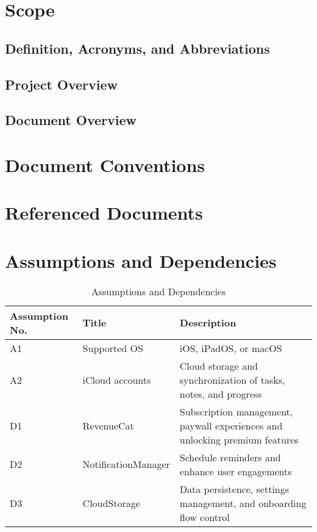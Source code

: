 \documentclass[11pt]{article}
\begin{document}
\section{Scope}

\subsection{Definition, Acronyms, and Abbreviations}

\subsection{Project Overview}

\subsection{Document Overview}

\section{Document Conventions}

\section{Referenced Documents}

\newpage
\section{Assumptions and Dependencies}
\begin{table}[h]
    \centering
    \caption{Assumptions and Dependencies}
    \begin{tabular}{p{2cm} p{3.5cm} p{10cm}}
        \toprule
        Assumption No. 
        & Title 
        & Description \\
        
        \midrule
        A1 
        & Supported OS
        & iOS, iPadOS, or macOS \\

        \midrule
        A2
        & iCloud accounts
        & Cloud storage and synchronization of tasks, notes, and progress \\

        \midrule
        D1
        & RevenueCat 
        & Subscription management, paywall experiences and unlocking premium features \\

        \midrule
        D2
        & NotificationManager 
        & Schedule reminders and enhance user engagements \\

        \midrule
        D3
        & CloudStorage 
        & Data persistence, settings management, and onboarding flow control \\     
        \bottomrule
    \end{tabular}
    \label{tab:docs_rev_hist}
\end{table}
\end{document}
